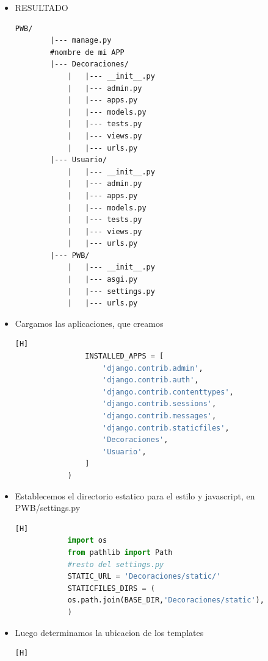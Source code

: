 \documentclass{article}
\begin{document}
\begin{itemize}
        \begin{lstlisting}[language=bash,caption={Entorno de Linux-Ejecute el script de activación para activar el entorno virtual:}][H]
    		          python manage.py startapp {{nombre_app}}
    	\end{lstlisting}
        \item RESULTADO
        \begin{lstlisting}[style=ascii-tree]
        PWB/
        |--- manage.py
        #nombre de mi APP
        |--- Decoraciones/
            |   |--- __init__.py
            |   |--- admin.py
            |   |--- apps.py
            |   |--- models.py
            |   |--- tests.py
            |   |--- views.py
            |   |--- urls.py
        |--- Usuario/
            |   |--- __init__.py
            |   |--- admin.py
            |   |--- apps.py
            |   |--- models.py
            |   |--- tests.py
            |   |--- views.py
            |   |--- urls.py
        |--- PWB/
            |   |--- __init__.py
            |   |--- asgi.py
            |   |--- settings.py
            |   |--- urls.py
        \end{lstlisting}
        \item Cargamos las aplicaciones, que creamos
            \begin{lstlisting}[language=python,caption={PWB/settings.py}][H]
                INSTALLED_APPS = [
                    'django.contrib.admin',
                    'django.contrib.auth',
                    'django.contrib.contenttypes',
                    'django.contrib.sessions',
                    'django.contrib.messages',
                    'django.contrib.staticfiles',
                    'Decoraciones',
                    'Usuario',
                ]
            )
        \end{lstlisting}
        \item Establecemos el directorio estatico para el estilo y javascript, en PWB/settings.py
         \begin{lstlisting}[language=python,caption={PWB/settings.py}][H]
            import os
            from pathlib import Path
            #resto del settings.py
            STATIC_URL = 'Decoraciones/static/'
            STATICFILES_DIRS = (
            os.path.join(BASE_DIR,'Decoraciones/static'),
            )
    \end{lstlisting}
    \item Luego determinamos la ubicacion de los templates
            \begin{lstlisting}[language=python,caption={PWB/settings.py}][H]

\end{lstlisting}
\end{itemize}
\end{document}
